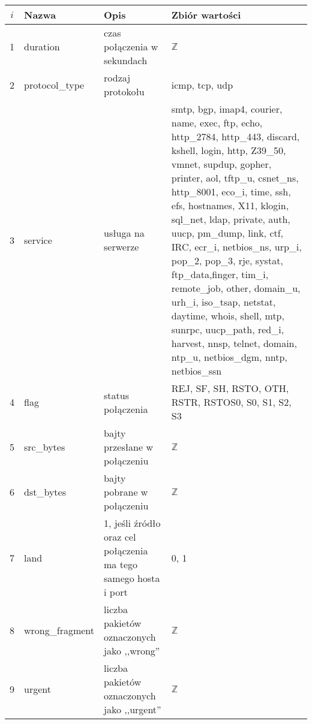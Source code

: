 \documentclass[a4paper, 12pt]{article}
\begin{document}
\begin{tabular}{ | c | p{3cm} | p{3cm} | p{6cm} | } \hline
$i$ & Nazwa & Opis & Zbiór wartości \\ \hline
1      & duration & czas połączenia w sekundach & $\mathbb{Z}$ \\ \hline
2      & protocol\_type & rodzaj protokołu & icmp, tcp, udp \\ \hline
3      & service & usługa na serwerze & smtp, bgp, imap4, courier, name, exec, ftp, echo, http\_2784,
                       http\_443, discard, kshell, login, http, Z39\_50, vmnet, supdup,
                       gopher, printer, aol, tftp\_u, csnet\_ns, http\_8001, eco\_i, time,
                       ssh, efs, hostnames, X11, klogin, sql\_net, ldap, private,
                       auth, uucp, pm\_dump, link, ctf, IRC, ecr\_i, netbios\_ns, urp\_i,
                       pop\_2, pop\_3, rje, systat, ftp\_data,finger, tim\_i, remote\_job,
                       other, domain\_u, urh\_i, iso\_tsap, netstat, daytime, whois, shell,
                       mtp, sunrpc, uucp\_path, red\_i, harvest, nnsp, telnet, domain,
                       ntp\_u, netbios\_dgm, nntp, netbios\_ssn \\ \hline
4      & flag & status połączenia & REJ, SF, SH, RSTO, OTH, RSTR, RSTOS0, S0, S1, S2, S3 \\ \hline
5      & src\_bytes  & bajty przesłane w połączeniu & $\mathbb{Z}$ \\ \hline
6      & dst\_bytes  & bajty pobrane w połączeniu  & $\mathbb{Z}$ \\ \hline
7      & land & 1, jeśli źródło oraz cel połączenia ma tego samego hosta i port & 0, 1 \\ \hline
8      & wrong\_fragment  & liczba pakietów oznaczonych jako ,,wrong'' & $\mathbb{Z}$ \\ \hline
9      & urgent  & liczba pakietów oznaczonych jako ,,urgent''  & $\mathbb{Z}$ \\ \hline
\end{tabular}
\end{document}
